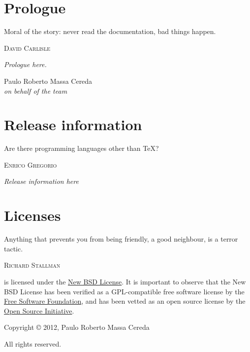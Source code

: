 \documentclass[a4paper,twoside,12pt]{memoir}
\begin{document}
\chapter*{Prologue}
\label{chap:prologue}

\epigraph{Moral of the story: never read the documentation, bad things happen.}{\textsc{David Carlisle}}

\emph{Prologue here.}

\vfill

\begin{flushright}
Paulo Roberto Massa Cereda\\
\emph{on behalf of the \arara team}
\end{flushright}

\chapter*{Release information}
\label{chap:releaseinformation}

\epigraph{Are there programming languages other than \TeX?}{\textsc{Enrico Gregorio}}

\emph{Release information here}

\chapter*{Licenses}
\label{chap:licenses}

\epigraph{Anything that prevents you from being friendly, a good neighbour, is a terror tactic.}{\textsc{Richard Stallman}}

\noindent\arara is licensed under the \href{http://www.opensource.org/licenses/bsd-license.php}{New BSD License}. It is important to observe that the New BSD License has been verified as a GPL-compatible free software license by the \href{http://www.fsf.org/}{Free Software Foundation}, and has been vetted as an open source license by the \href{http://www.opensource.org/}{Open Source Initiative}.

\ornamentline

\begin{center}
\scalebox{0.5}{\araralogo}

\slogan
\end{center}

\vspace{0.5em}

\noindent Copyright \copyright{} 2012, Paulo Roberto Massa Cereda

\noindent All rights reserved.
\end{document}
